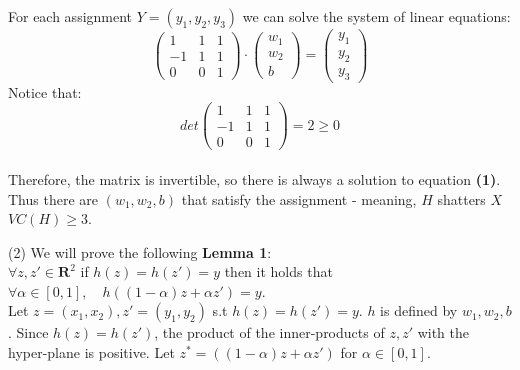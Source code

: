 \documentclass{article}
\begin{document}
\begin{enumerate}
		For each assignment ${Y =(y_1, y_2, y_3)}$ we can solve the system of linear equations:
		\begin{equation}
			\begin{pmatrix}
			  1 & 1 & 1\\
			  -1 & 1 & 1\\
			  0 & 0 & 1
			\end{pmatrix}
			\cdot
			\begin{pmatrix}
				w_1\\
				w_2\\
				b
			\end{pmatrix}
			= 
			\begin{pmatrix}
				y_1\\
				y_2\\
				y_3
			\end{pmatrix}
		\end{equation}
		Notice that:
		\begin{equation*}
			det
			\begin{pmatrix}
				1 & 1 & 1\\
				-1 & 1 & 1\\
				0 & 0 & 1
			\end{pmatrix} = 2 \geq 0
		\end{equation*}\\
		Therefore, the matrix is invertible, so there is always a solution to equation \textbf{(1)}. Thus there are ${(w_1, w_2, b)}$ that satisfy the assignment - meaning, ${H}$ shatters ${X}$ {\Rightarrow} ${VC(H) \geq 3}$.
		
		(2) We will prove the following \textbf{Lemma 1}:\\
		
		${\forall z, z' \in \mathbf{R}^2}$ if ${h(z) = h(z') = y}$ then it holds that ${\forall \alpha \in [0,1],\quad h((1-\alpha)z + \alpha z') = y}$.\\
		
		Let ${z = (x_1, x_2), z' = (y_1, y_2)}$ s.t ${h(z) = h(z') = y}$. ${h}$ is defined by ${w_1, w_2, b}$. Since ${h(z) = h(z')}$, the product of the inner-products of ${z, z'}$ with the hyper-plane is positive. Let ${z^* = ((1-\alpha)z + \alpha z')}$ for ${\alpha \in [0,1]}$.\\
		

\end{enumerate}
\end{document}
